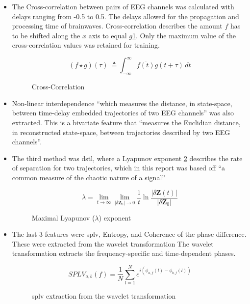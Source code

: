 \documentclass[12pt]{article}
\begin{document}
\begin{itemize}
\item The Cross-correlation between pairs of EEG channels was calculated with delays ranging from -0.5 to 0.5. The delays allowed for the propagation and processing time of brainwaves. Cross-correlation describes the amount $f$ has to be shifted along the $x$ axis to equal $g$\ref{eq:crossCorrelation}. Only the maximum value of the cross-correlation values was retained for training.

\begin{figure}[H]
\[ (f \star g)(\tau)\ \triangleq \int_{-\infty}^{\infty} \overline{f(t)} g(t+\tau)\,dt \]
\caption{Cross-Correlation}
\label{eq:crossCorrelation}
\end{figure}

\item Non-linear interdependence ``which measures the distance, in state-space, between time-delay embedded trajectories of two EEG channels'' was also extracted. This is a bivariate feature that ``measures the Euclidian distance, in reconstructed state-space, between trajectories described by two EEG channels''.

\item The third method was \acrfull{dstl}, where a Lyapunov exponent \ref{eq:lyapunov} describes the rate of separation for two trajectories, which in this report was based off ``a common measure of the chaotic nature of a signal'' \cite{mirowski2009classification}

\begin{figure}[H]
\[ \lambda = \lim_{t \to \infty} \lim_{|\delta \mathbf{Z}_0| \to 0} \frac{1}{t} \ln\frac{| \delta\mathbf{Z}(t)|}{|\delta \mathbf{Z}_0|} \]
\caption{Maximal Lyapunov ($\lambda$) exponent}
\label{eq:lyapunov}
\end{figure}

\item The last 3 features were \acrfull{splv}, Entropy, and Coherence of the phase difference. These were extracted from the wavelet transformation The wavelet transformation extracts the frequency-specific and time-dependent phases.

\begin{figure}[H]
\[ SPLV_{a,b}(f) = \frac{1}{N} \sum_{l=1}^{N} e^{i\left(\phi_{a,f}(l) - \phi_{b,f}(l)\right)} \]
\caption{\acrfull{splv} extraction from the wavelet transformation}
\label{eq:splv}
\end{figure}

\end{itemize}
\end{document}
